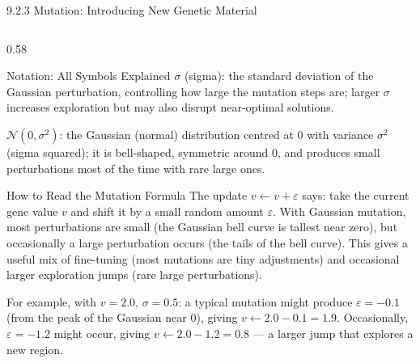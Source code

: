 \documentclass[aspectratio=169,10pt]{beamer}
\begin{document}
\begin{frame}[allowframebreaks]{9.2.3 Mutation: Introducing New Genetic Material}
\begin{columns}[T]
\begin{column}{0.58\textwidth}
\begin{block}{Notation: All Symbols Explained}
        $\sigma$ (sigma): the standard deviation of the Gaussian
        perturbation, controlling how large the mutation steps are;
        larger $\sigma$ increases exploration but may also disrupt
        near-optimal solutions.

        $\mathcal{N}(0, \sigma^2)$: the Gaussian (normal)
        distribution centred at 0 with variance $\sigma^2$ (sigma
        squared); it is bell-shaped, symmetric around 0, and produces
        small perturbations most of the time with rare large ones.
      \end{block}

      \begin{alertblock}{How to Read the Mutation Formula}
        The update $v \leftarrow v + \varepsilon$ says: take the
        current gene value $v$ and shift it by a small random amount
        $\varepsilon$.  With Gaussian mutation, most perturbations
        are small (the Gaussian bell curve is tallest near zero),
        but occasionally a large perturbation occurs (the tails of
        the bell curve).  This gives a useful mix of fine-tuning
        (most mutations are tiny adjustments) and occasional
        larger exploration jumps (rare large perturbations).

        For example, with $v = 2.0$, $\sigma = 0.5$: a typical
        mutation might produce $\varepsilon = -0.1$ (from the peak
        of the Gaussian near 0), giving $v \leftarrow 2.0 - 0.1
        = 1.9$.  Occasionally, $\varepsilon = -1.2$ might occur,
        giving $v \leftarrow 2.0 - 1.2 = 0.8$ --- a larger jump
        that explores a new region.
      \end{alertblock}


\end{column}
\end{columns}
\end{frame}
\end{document}
